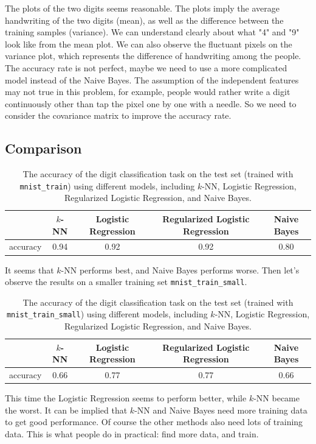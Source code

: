 \documentclass{article}
\begin{document}
The plots of the two digits seems reasonable. The plots imply the average handwriting of the two digits (mean), as well as the difference between the training samples (variance). We can understand clearly about what "4" and "9" look like from the mean plot. We can also observe the fluctuant pixels on the variance plot, which represents the difference of handwriting among the people.\\

The accuracy rate is not perfect, maybe we need to use a more complicated model instead of the Naive Bayes. The assumption of the independent features may not true in this problem, for example, people would rather write a digit continuously other than tap the pixel one by one with a needle. So we need to consider the covariance matrix to improve the accuracy rate.\\

\subsection{Comparison}

\begin{table}[htbp]
\centering
\begin{tabular}{lcccc}
\toprule
\ & $k$-NN & Logistic Regression & Regularized Logistic Regression & Naive Bayes\\
\midrule
accuracy & 0.94 & 0.92 & 0.92 & 0.80\\
\bottomrule
\end{tabular}
\caption{The accuracy of the digit classification task on the test set (trained with \texttt{mnist\_train}) using different models, including $k$-NN, Logistic Regression, Regularized Logistic Regression, and Naive Bayes. 
\label{table:acc-all}}
\end{table}

It seems that $k$-NN performs best, and Naive Bayes performs worse. Then let's observe the results on a smaller training set \texttt{mnist\_train\_small}.\\

\begin{table}[htbp]
\centering
\begin{tabular}{lcccc}
\toprule
\ & $k$-NN & Logistic Regression & Regularized Logistic Regression & Naive Bayes\\
\midrule
accuracy & 0.66 & 0.77 & 0.77 & 0.66\\
\bottomrule
\end{tabular}
\caption{The accuracy of the digit classification task on the test set (trained with \texttt{mnist\_train\_small}) using different models, including $k$-NN, Logistic Regression, Regularized Logistic Regression, and Naive Bayes. 
\label{table:acc-s-all}}
\end{table}

This time the Logistic Regression seems to perform better, while $k$-NN became the worst. It can be implied that $k$-NN and Naive Bayes need more training data to get good performance. Of course the other methods also need lots of training data. This is what people do in practical: find more data, and train.\\
\end{document}

